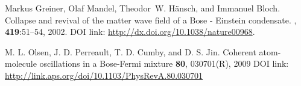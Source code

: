 \documentclass[a4paper,10pt]{article}
\begin{document}
\begin{thebibliography}{10}

Markus Greiner, Olaf Mandel, Theodor~W. H{\"a}nsch, and Immanuel Bloch.
\newblock Collapse and revival of the matter wave field of a {B}ose -
  {E}instein condensate.
, \textbf{419}:51--54, 2002.
\newblock DOI link: \url{http://dx.doi.org/10.1038/nature00968}.







M. L. Olsen, J. D. Perreault, T. D. Cumby, and D. S. Jin.
\newblock Coherent atom-molecule oscillations in a Bose-Fermi mixture
 \textbf{80}, 030701(R), 2009
\newblock DOI link: \url{http://link.aps.org/doi/10.1103/PhysRevA.80.030701}


\end{thebibliography}
\end{document}
